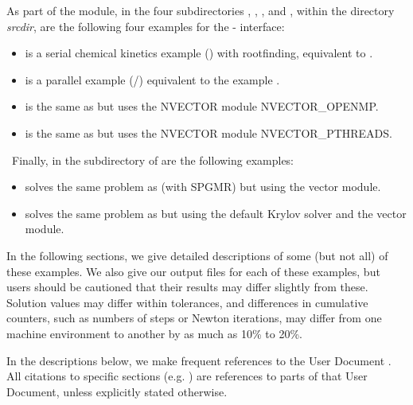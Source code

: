 \vspace{0.2in}\noindent
As part of the {\fida} module, in the four subdirectories ,
, , and ,
within the directory {\em srcdir},
are the following four examples for the {\F}-{\CC} interface:
%
\begin{itemize}
\item {} is a serial chemical kinetics example ({\dense})
       with rootfinding, equivalent to .

\item {} is a parallel example ({\spgmr}/{\idabbdpre})
       equivalent to the example .

\item {} is the same as  but
       uses the NVECTOR module NVECTOR\_OPENMP.

\item {} is the same as  but
       uses the NVECTOR module NVECTOR\_PTHREADS.

\end{itemize}
\
Finally, in the subdirectory  of  are the
following examples:
\begin{itemize}
\item {} solves the same problem as 
      (with SPGMR) but using the {\petsc} vector module.
\item {} solves the same problem as 
      but using the default {\petsc} Krylov solver and the {\petsc} vector module.
\end{itemize}

\vspace{0.2in}\noindent 
In the following sections, we give detailed descriptions of some (but
not all) of these examples.  We also give our output files for
each of these examples, but users should be cautioned that their
results may differ slightly from these.  Solution
values may differ within tolerances, and differences in cumulative
counters, such as numbers of steps or Newton iterations, may differ
from one machine environment to another by as much as 10\% to 20\%.

In the descriptions below, we make frequent references to the {\ida}
User Document \cite{ida_ug}.  All citations to specific sections
(e.g. \ugref{s:types}) are references to parts of that User Document, unless
explicitly stated otherwise.

